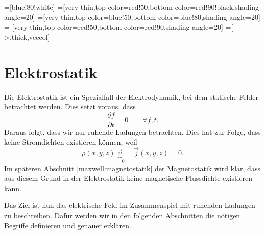 %
%
%
%

\tikzset{>=latex} %
\usetikzlibrary {arrows.meta}
\pgfplotsset{compat=1.13}
\usetikzlibrary{decorations.markings,intersections,calc}
\usetikzlibrary{angles,quotes} %
=[blue!80!white]
=[very thin,top color=red!50,bottom color=red!90!black,shading angle=20]
=[very thin,top color=blue!50,bottom color=blue!80,shading angle=20]
 = [very thin,top color=red!50,bottom color=red!90,shading angle=20]
=[->,thick,veccol]


\section{Elektrostatik\label{maxwell:section:elekktrostatik}}
Die Elektrostatik ist ein Spezialfall der Elektrodynamik, bei dem statische Felder betrachtet werden.
Dies setzt voraus, dass
\begin{equation}
	\frac{\partial f}{\partial t}
	=
	0
	\qquad
	\forall f,t.
	\label{maxwell:section:definition_statik}
\end{equation}
Daraus folgt, dass wir nur ruhende Ladungen betrachten.
Dies hat zur Folge, dass keine Stromdichten existieren können, weil
\begin{equation}
	\rho(x,y,z) \underbrace{\vec{v}}_{=0}
	=
	\vec{j}(x,y,z)
	=
	0.
\end{equation}
Im späteren Abschnitt \ref{maxwell:magnetostatik} der Magnetostatik wird klar, dass aus diesem Grund in der Elektrostatik keine magnetische Flussdichte existieren kann.
 
Das Ziel ist nun das elektrische Feld im Zusammenspiel mit ruhenden Ladungen zu beschreiben.
Dafür werden wir in den folgenden Abschnitten die nötigen Begriffe definieren und genauer erklären.

